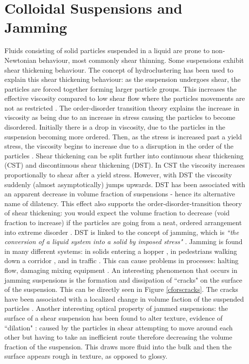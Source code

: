 \documentclass[twoside,a4]{report}
\def\br{\newline \newline \noindent}
\begin{document}
	\section*{Colloidal Suspensions and Jamming}
	Fluids consisting of solid particles suspended in a liquid are prone to non-Newtonian behaviour, most commonly shear thinning. Some suspensions exhibit shear thickening behaviour. The concept of hydroclustering has been used to explain this shear thickening behaviour: as the suspension undergoes shear, the particles are forced together forming larger particle groups. This increases the effective viscosity compared to low shear flow where the particles movements are not as restricted \cite{figshearthick}. The order-disorder transition  theory explains the increase in viscosity as being due to an increase in stress causing the particles to become disordered. Initially there is a drop in viscosity, due to the particles in the suspension becoming more ordered. Then, as the stress is increased past a yield stress, the viscosity begins to increase due to a disruption in the order of the particles \cite{backbrownjaegrev}. %
	\br
	Shear thickening can be split further into continuous shear thickening (CST) and discontinuous shear thickening (DST). In CST the viscosity increases proportionally to shear after a yield stress. However, with DST the viscosity suddenly (almost asymptotically) jumps upwards. DST has been associated with an apparent decrease in volume fraction of suspensions - hence its alternative name of dilatency. This effect also supports the order-disorder-transition theory of shear thickening: you would expect the volume fraction to decrease (void fraction to increase) if the particles are going from a neat, ordered arrangement into extreme disorder \cite{backbrownjaegrev}. 
	\br
	DST is linked to the concept of jamming, which is \textit{``the conversion of a liquid system into a solid by imposed stress"} \cite{backhawjam}. Jamming is found in many different systems: in solids entering a hopper \cite{back2djam}, in pedestrians walking down a corridor \cite{backpedjam}, and in traffic \cite{backcarjam}. This can cause problems in processes: halting flow, damaging mixing equipment \cite{backshearjambertrand}.
	\br 
	An interesting phenomenon that occurs in jamming suspensions is the formation and dissipation of ``cracks" on the surface of the suspension. This can be directly seen in Figure \ref{cforscracks}. The cracks have been associated with a localized change in volume faction of the suspended particles \cite{backhawjam}. Another interesting optical property of jammed suspensions: the surface of a shear suspension has been found to alter texture, evidence of ``dilation" \cite{backbrownjaegrev}: caused by the particles in shear attempting to move around each other but having to take an inefficient route therefore decreasing the volume fraction of the suspension. This draws more fluid into the bulk and then the surface appears rough in texture, as opposed to glossy. 
	
\end{document}
